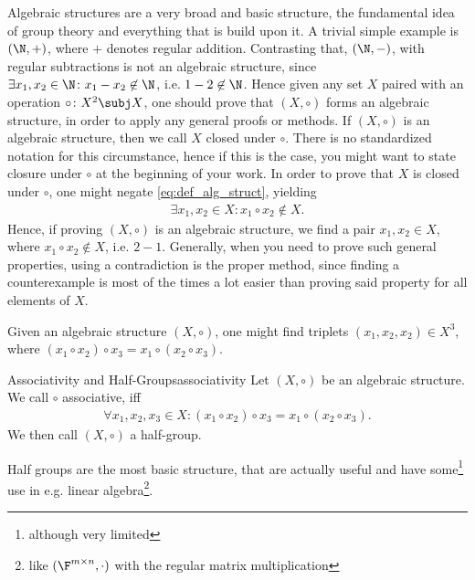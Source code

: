 Algebraic structures are a very broad and basic structure, the fundamental idea of group theory and everything that 
is build upon it. A trivial simple example is $(\N,+)$, where $+$ denotes regular addition. Contrasting that, 
$(\N,-)$, with regular subtractions is not an algebraic structure, since $\exists x_1,x_2\in\N\colon x_1-x_2\not\in\N$,
i.e. $1-2\not\in\N$. Hence given any set $X$ paired with an operation $\circ\colon X^2\subj X$, one should prove that
$(X,\circ)$ forms an algebraic structure, in order to apply any general proofs or methods. If $(X,\circ)$ is 
an algebraic structure, then we call $X$ closed under $\circ$. There is no standardized notation for this 
circumstance, hence if this is the case, you might want to state closure under $\circ$ at the beginning of your 
work. In order to prove that $X$ is closed under $\circ$, one might negate \cref{eq:def_alg_struct}, yielding
\begin{align}
    \exists x_1,x_2\in X\colon x_1\circ x_2\not\in X.\label{eq:neg_def_alg_struct}
\end{align}
Hence, if proving $(X,\circ)$ is an algebraic structure, we find a pair $x_1,x_2\in X$, where $x_1\circ x_2\not\in X$,
i.e. $2-1$. Generally, when you need to prove such general properties, using a contradiction is the proper method, since
finding a counterexample is most of the times a lot easier than proving said property for all elements of $X$.

Given an algebraic structure $(X,\circ)$, one might find triplets $(x_1,x_2,x_2)\in X^3$, where 
$(x_1\circ x_2) \circ x_3 = x_1\circ (x_2\circ x_3)$.

\begin{definition}{Associativity and Half-Groups}{associativity}
    Let $(X,\circ)$ be an algebraic structure. We call $\circ$ associative, iff
    \begin{align}
        \forall x_1,x_2,x_3 \in X \colon (x_1\circ x_2) \circ x_3 = x_1 \circ (x_2 \circ x_3).\label{eq:def_associativity}
    \end{align}
    We then call $(X,\circ)$ a half-group.
\end{definition}

Half groups are the most basic structure, that are actually useful and have some\footnote{although very limited} use 
in e.g. linear algebra\footnote{like $(\F^{m\times n},\cdot)$ with the regular matrix multiplication}.


